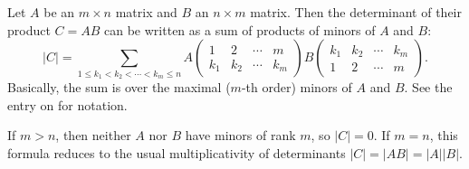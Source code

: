 \documentclass[12pt]{article}
\begin{document}

Let $A$ be an $m\times n$ matrix and $B$ an $n\times m$ matrix. Then
the determinant of their product $C=AB$ can be written as a sum of products of
minors of $A$ and $B$:
\begin{equation*}
  |C| = \sum_{1\le k_1<k_2<\cdots<k_m\le n}
    A\begin{pmatrix}
      1 & 2 & \cdots & m \\
      k_1 & k_2 & \cdots & k_m
    \end{pmatrix}
    B\begin{pmatrix}
      k_1 & k_2 & \cdots & k_m \\
      1 & 2 & \cdots & m
    \end{pmatrix}.
\end{equation*}
Basically, the sum is over the maximal ($m$-th order) minors of $A$ and $B$.
See the entry on  for notation.

If $m>n$, then neither $A$ nor $B$ have minors of rank $m$, so $|C|=0$.
If $m=n$, this formula reduces to the usual multiplicativity of determinants
$|C|=|AB|=|A||B|$.
\end{document}

